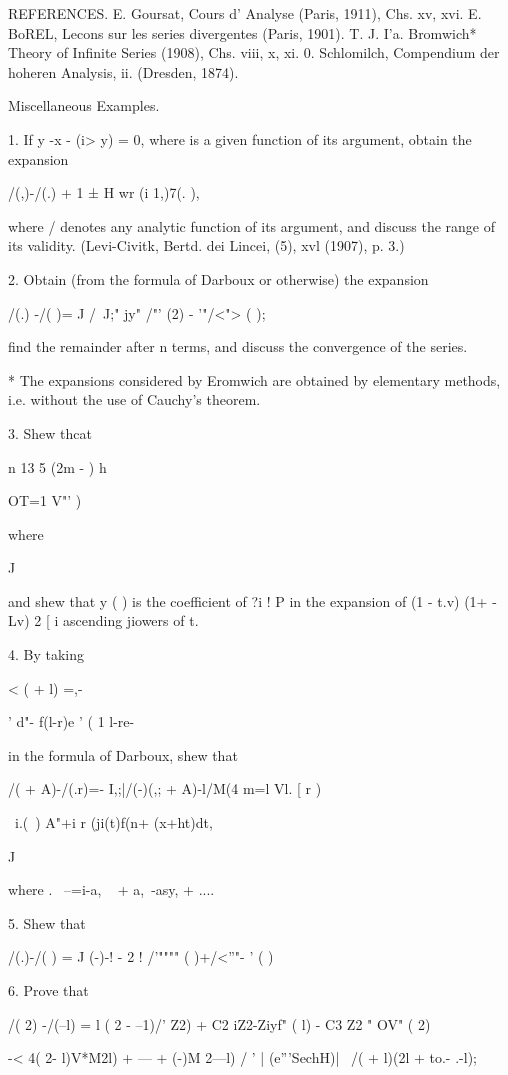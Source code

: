 {{REFERENCES. E. Goursat, Cours d' Analyse (Paris, 1911), Chs. xv, xvi.
E. BoREL, Lecons sur les series divergentes (Paris, 1901). T. J. I'a.
Bromwich* Theory of Infinite Series (1908), Chs. viii, x, xi. 0.
Schlomilch, Compendium der hoheren Analysis, ii. (Dresden, 1874).

Miscellaneous Examples.

1. If y -x - (i> y) = 0, where is a given function of its argument,
obtain the expansion

/(,)-/(.) + 1 ± H wr (i 1,)7(. ),

where / denotes any analytic function of its argument, and discuss the
range of its validity. (Levi-Civitk, Bertd. dei Lincei, (5), xvl
(1907), p. 3.)

2. Obtain (from the formula of Darboux or otherwise) the expansion

/(.) -/( )= J /~J;" jy" /"' (2) - '"/<"> ( );

find the remainder after n terms, and discuss the convergence of the
series.

* The expansions considered by Eromwich are obtained by elementary
methods, i.e. without the use of Cauchy's theorem.

%
%

3. Shew thcat

n 13 5 (2m - ) h

OT=1 V"' )

where

J

and shew that y ( ) is the coefficient of ?i ! P in the expansion of
(1 - t.v) (1+ - Lv) 2 [ i ascending jiowers of t.

4. By taking

< ( + l) =,-

' d"- f(l-r)e ' ( 1 l-re-

in the formula of Darboux, shew that

/( + A)-/(.r)=- I,;|/(-)(,; + A)-l/M(4 m=l Vl. [ r )

\ i.(\ ) A"+i r (ji(t)f(n+ (x+ht)dt,

J

where . \ --=i-a, ~ + a,~-asy, + ....

5. Shew that

/(.)-/( ) = J (-)-! - 2 ! /'"""" ( )+/<''"- ' ( )

6. Prove that

/( 2) -/(--l) = l ( 2 - --1)/' Z2) + C2 iZ2-Ziyf" ( l) - C3 Z2 " OV" (
2)

-< 4( 2- l)V*M2l) + --- + (-)M 2---l) / ' | (e'''SechH)| \ /( + l)(2l
+ to.- .-l);

}}
